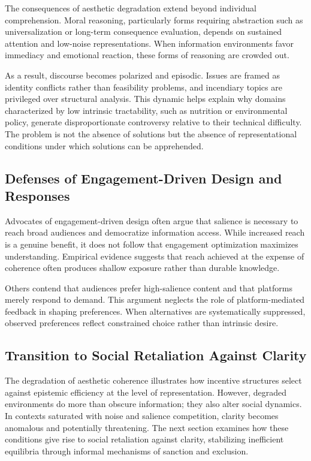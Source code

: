 \documentclass[11pt]{article}
\begin{document}
The consequences of aesthetic degradation extend beyond individual comprehension. Moral reasoning, particularly forms requiring abstraction such as universalization or long-term consequence evaluation, depends on sustained attention and low-noise representations. When information environments favor immediacy and emotional reaction, these forms of reasoning are crowded out.

As a result, discourse becomes polarized and episodic. Issues are framed as identity conflicts rather than feasibility problems, and incendiary topics are privileged over structural analysis. This dynamic helps explain why domains characterized by low intrinsic tractability, such as nutrition or environmental policy, generate disproportionate controversy relative to their technical difficulty. The problem is not the absence of solutions but the absence of representational conditions under which solutions can be apprehended.

\subsection{Defenses of Engagement-Driven Design and Responses}

Advocates of engagement-driven design often argue that salience is necessary to reach broad audiences and democratize information access. While increased reach is a genuine benefit, it does not follow that engagement optimization maximizes understanding. Empirical evidence suggests that reach achieved at the expense of coherence often produces shallow exposure rather than durable knowledge.

Others contend that audiences prefer high-salience content and that platforms merely respond to demand. This argument neglects the role of platform-mediated feedback in shaping preferences. When alternatives are systematically suppressed, observed preferences reflect constrained choice rather than intrinsic desire.

\subsection{Transition to Social Retaliation Against Clarity}

The degradation of aesthetic coherence illustrates how incentive structures select against epistemic efficiency at the level of representation. However, degraded environments do more than obscure information; they also alter social dynamics. In contexts saturated with noise and salience competition, clarity becomes anomalous and potentially threatening. The next section examines how these conditions give rise to social retaliation against clarity, stabilizing inefficient equilibria through informal mechanisms of sanction and exclusion.
\end{document}
